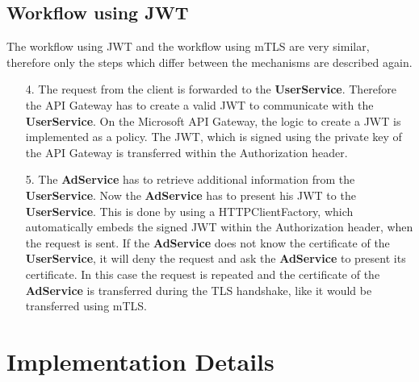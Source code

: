 \subsection{Workflow using JWT}
The workflow using JWT and the workflow using mTLS are very similar, therefore only the steps which differ between the mechanisms are described again.
\begin{enumerate}
	\item[4.] The request from the client is forwarded to the \textbf{UserService}. 
		Therefore the API Gateway has to create a valid JWT to communicate with the \textbf{UserService}.
		On the Microsoft API Gateway, the logic to create a JWT is implemented as a policy.
		The JWT, which is signed using the private key of the API Gateway is transferred within the Authorization header.
	\item[5.] The \textbf{AdService} has to retrieve additional information from the \textbf{UserService}.
		Now the \textbf{AdService} has to present his JWT to the \textbf{UserService}.
		This is done by using a HTTPClientFactory, which automatically embeds the signed JWT within the Authorization header, when the request is sent.
		If the \textbf{AdService} does not know the certificate of the \textbf{UserService}, it will deny the request and ask the \textbf{AdService} to present its certificate.
		In this case the request is repeated and the certificate of the \textbf{AdService} is transferred during the TLS handshake, like it would be transferred using mTLS.
\end{enumerate}

\section{Implementation Details}

